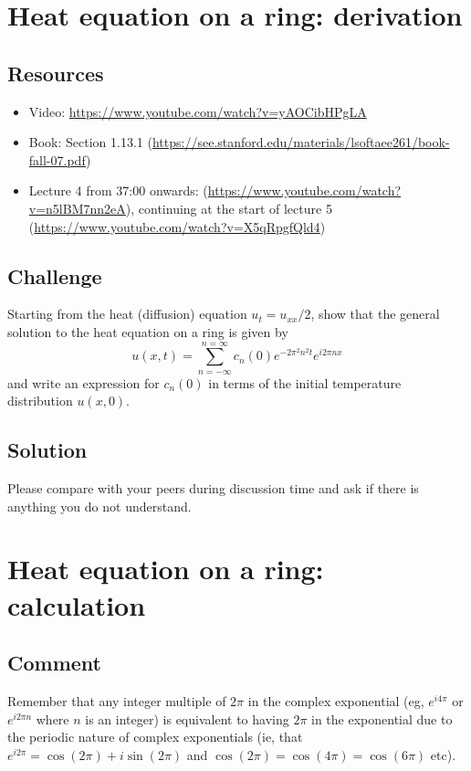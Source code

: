 \newpage
\section{Heat equation on a ring: derivation}
\label{sec:heateqnfc}

\subsection*{Resources}
\begin{itemize}
    \item Video: \url{https://www.youtube.com/watch?v=yAOCibHPgLA}
    \item Book: Section 1.13.1 (\url{https://see.stanford.edu/materials/lsoftaee261/book-fall-07.pdf})
    \item Lecture 4 from 37:00 onwards: (\url{https://www.youtube.com/watch?v=n5lBM7nn2eA}), continuing at the start of lecture 5 (\url{https://www.youtube.com/watch?v=X5qRpgfQld4})
\end{itemize}

\subsection*{Challenge}
Starting from the heat (diffusion) equation $u_t = u_{xx}/2$, show that the general solution to the heat equation on a ring is given by
\begin{equation}
    u(x,t) = \sum_{n=-\infty}^{n=\infty} c_n(0) e^{-2 \pi^2 n^2 t} e^{i 2 \pi n x}
\end{equation}
and write an expression for $c_n(0)$ in terms of the initial temperature distribution $u(x,0)$.

\subsection*{Solution}
Please compare with your peers during discussion time and ask if there is anything you do not understand.




\newpage
\section{Heat equation on a ring: calculation}
\label{sec:heateqn}

\subsection*{Comment}
Remember that any integer multiple of $2 \pi$ in the complex exponential (eg, $e^{i 4 \pi}$ or $e^{i 2 \pi n}$ where $n$ is an integer) is equivalent to having $2 \pi$ in the exponential due to the periodic nature of complex exponentials (ie, that $e^{i 2 \pi} = \cos(2 \pi) + i \sin(2 \pi)$ and $\cos(2 \pi) = \cos(4 \pi) = \cos(6 \pi)$ etc).

